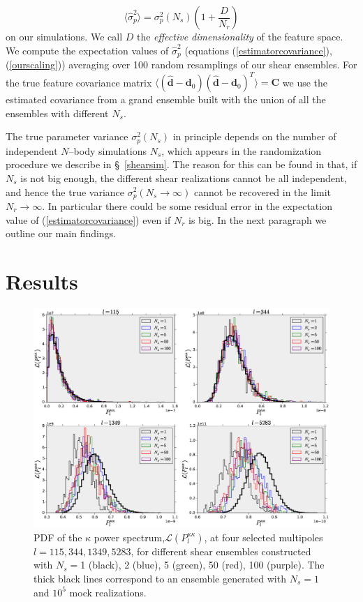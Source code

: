 \documentclass[reprint,aps,prd,superscriptaddress,showkeys,showpacs]{revtex4-1}
\newcommand{\bb}[1]{\mathbf{#1}}
\newcommand{\bbh}[1]{\mathbf{\hat{#1}}}
\newcommand{\h}[1]{\hat{#1}}
\begin{document}
\begin{equation}
\label{ourscaling}
\langle\h{\sigma}_p^2\rangle = \sigma^2_p(N_s)\left(1+\frac{D}{N_r}\right)
\end{equation}
%
on our simulations. We call $D$ the \textit{effective dimensionality} of the feature space. We compute the expectation values of $\h{\sigma}^2_p$ (equations (\ref{estimatorcovariance}),(\ref{ourscaling})) averaging over 100 random resamplings of our shear ensembles. For the true feature covariance matrix $\langle(\bbh{d}-\bb{d}_0)(\bbh{d}-\bb{d}_0)^T\rangle=\bb{C}$ we use the estimated covariance from a grand ensemble built with the union of all the ensembles with different $N_s$. 

The true parameter variance $\sigma^2_p(N_s)$ in principle depends on the number of independent $N$--body simulations $N_s$, which appears in the randomization procedure we describe in \S~\ref{shearsim}. The reason for this can be found in that, if $N_s$ is not big enough, the different shear realizations cannot be all independent, and hence the true variance $\sigma^2_p(N_s\rightarrow\infty)$ cannot be recovered in the limit $N_r\rightarrow\infty$. In particular there could be some residual error in the expectation value of (\ref{estimatorcovariance}) even if $N_r$ is big. In the next paragraph we outline our main findings.
 


\section{Results} 


\begin{figure}
\includegraphics[scale=0.4]{Figures/ps_pdf.eps}
\caption{PDF of the $\kappa$ power spectrum,$\mathcal{L}(P_l^{\kappa\kappa})$, at four selected multipoles $l=115,344,1349,5283$, for different shear ensembles constructed with $N_s=$1 (black), 2 (blue), 5 (green), 50 (red), 100 (purple). The thick black lines correspond to an ensemble generated with $N_s=1$ and $10^5$ mock realizations.}
\label{ps_pdf}
\end{figure}
\end{document}
